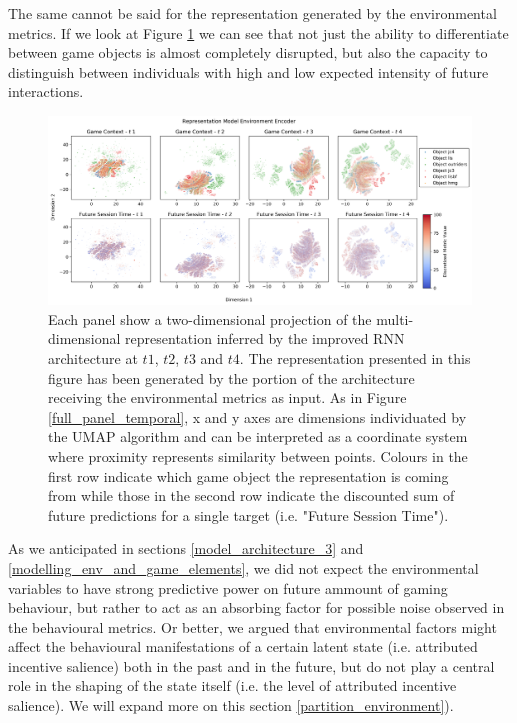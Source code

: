 The same cannot be said for the representation generated by the environmental metrics. If we look at Figure \ref{rnn_env_even_full_env} we can see that not just the ability to differentiate between game objects is almost completely disrupted, but also the capacity to distinguish between individuals with high and low expected intensity of future interactions. 

\begin{figure}[ht]
\centering
\includegraphics[width=\textwidth]{images/chapter_4/RNN_env_even_0_lstm_layer_env_Future Session Time.png}
\caption[\textbf{Lower dimensional representation of the latent representations generated by the improved version of the RNN architecture from the environmental metrics}]{Each panel show a two-dimensional projection of the multi-dimensional representation inferred by the improved RNN architecture at $t1$, $t2$, $t3$ and $t4$. The representation presented in this figure has been generated by the portion of the architecture receiving the environmental metrics as input. As in Figure \ref{full_panel_temporal}, x and y axes are dimensions individuated by the UMAP algorithm and can be interpreted as a coordinate system where proximity represents similarity between points. Colours in the first row indicate which game object the representation is coming from while those in the second row indicate the discounted sum of future predictions for a single target (i.e. "Future Session Time").}
\label{rnn_env_even_full_env}
\end{figure}

As we anticipated in sections \ref{model_architecture_3} and \ref{modelling_env_and_game_elements}, we did not expect the environmental variables to have strong predictive power on future ammount of gaming behaviour, but rather to act as an absorbing factor for possible noise observed in the behavioural metrics. Or better, we argued that environmental factors might affect the behavioural manifestations of a certain latent state (i.e. attributed incentive salience) both in the past and in the future, but do not play a central role in the shaping of the state itself (i.e. the level of attributed incentive salience). We will expand more on this section \ref{partition_environment}).

